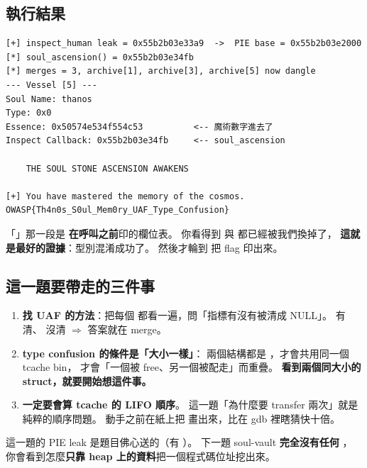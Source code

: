 \subsection{執行結果}

\begin{lstlisting}[style=raw]
[+] inspect_human leak = 0x55b2b03e33a9  ->  PIE base = 0x55b2b03e2000
[*] soul_ascension() = 0x55b2b03e34fb
[*] merges = 3, archive[1], archive[3], archive[5] now dangle
--- Vessel [5] ---
Soul Name: thanos
Type: 0x0
Essence: 0x50574e534f554c53          <-- 魔術數字進去了
Inspect Callback: 0x55b2b03e34fb     <-- soul_ascension

    THE SOUL STONE ASCENSION AWAKENS

[+] You have mastered the memory of the cosmos.
OWASP{Th4n0s_S0ul_Mem0ry_UAF_Type_Confusion}
\end{lstlisting}

\begin{keybox}[注意輸出的順序]
「」那一段是  \textbf{在呼叫之前}印的欄位表。
你看得到  與  都已經被我們換掉了，
\textbf{這就是最好的證據}：型別混淆成功了。
然後才輪到  把 flag 印出來。
\end{keybox}

\subsection{這一題要帶走的三件事}

\begin{enumerate}[leftmargin=1.5em,itemsep=3pt]
  \item \textbf{找 UAF 的方法}：把每個  都看一遍，問「指標有沒有被清成 NULL」。
         有清、 沒清 $\Rightarrow$ 答案就在 merge。
  \item \textbf{type confusion 的條件是「大小一樣」}：
        兩個結構都是 ，才會共用同一個 tcache bin，
        才會「一個被 free、另一個被配走」而重疊。
        \textbf{看到兩個同大小的 struct，就要開始想這件事。}
  \item \textbf{一定要會算 tcache 的 LIFO 順序}。
        這一題「為什麼要 transfer 兩次」就是純粹的順序問題。
        動手之前在紙上把  畫出來，比在 gdb 裡瞎猜快十倍。
\end{enumerate}

\begin{warnbox}[下一題會更難]
這一題的 PIE leak 是題目佛心送的（有 ）。
下一題 soul-vault \textbf{完全沒有任何 }，
你會看到怎麼\textbf{只靠 heap 上的資料}把一個程式碼位址挖出來。
\end{warnbox}
